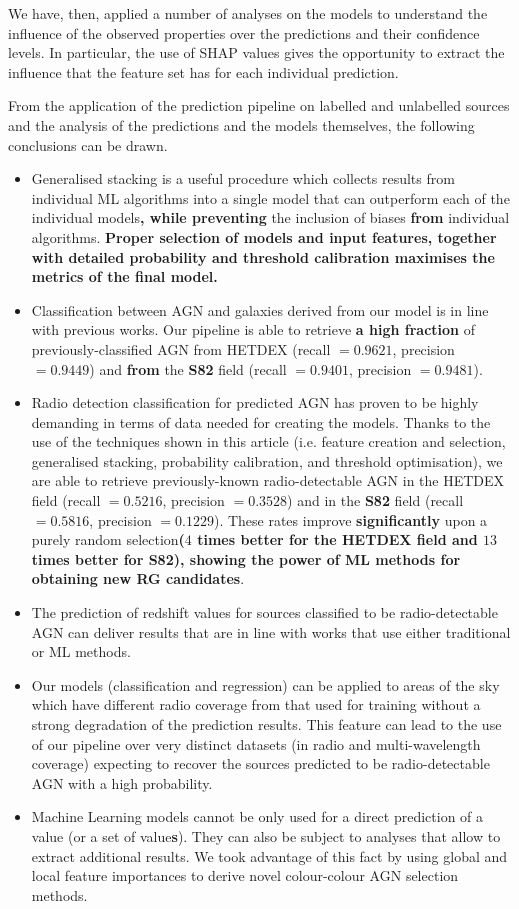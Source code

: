 \documentclass{aa}
\begin{document}
We have, then, applied a number of analyses on the models to understand the influence of the observed properties over the predictions and their confidence levels. In particular, the use of SHAP values gives the opportunity to extract the influence that the feature set has for each individual prediction.

From the application of the prediction pipeline on labelled and unlabelled sources and the analysis of the predictions and the models themselves, the following conclusions can be drawn.

\begin{itemize}
\item Generalised stacking is a useful procedure which collects results from individual ML algorithms into a single model that can outperform each of the individual models\textbf{, while preventing} the inclusion of biases \textbf{from} individual algorithms. \textbf{Proper selection of models and input features, together with detailed probability and threshold calibration maximises the metrics of the final model.}
\item Classification between AGN and galaxies derived from our model is in line with previous works. Our pipeline is able to retrieve \textbf{a high fraction} of previously-classified AGN from HETDEX (recall $= 0.9621$, precision $= 0.9449$) and \textbf{from} the \textbf{S82} field (recall $= 0.9401$, precision $= 0.9481$).
\item Radio detection classification for predicted AGN has proven to be highly demanding in terms of data needed for creating the models. Thanks to the use of the techniques shown in this article (i.e. feature creation and selection, generalised stacking, probability calibration, and threshold optimisation), we are able to retrieve previously-known radio-detectable AGN in the HETDEX field (recall $= 0.5216$, precision $= 0.3528$) and in the \textbf{S82} field (recall $= 0.5816$, precision $= 0.1229$). These rates improve \textbf{significantly} upon a purely random selection\textbf{($4$ times better for the HETDEX field and $13$ times better for S82), showing the power of ML methods for obtaining new RG candidates}.
\item The prediction of redshift values for sources classified to be radio-detectable AGN can deliver results that are in line with works that use either traditional or ML methods.
\item Our models (classification and regression) can be applied to areas of the sky which have different radio coverage from that used for training without a strong degradation of the prediction results. This feature can lead to the use of our pipeline over very distinct datasets (in radio and multi-wavelength coverage) expecting to recover the sources predicted to be radio-detectable AGN with a high probability.
\item Machine Learning models cannot be only used for a direct prediction of a value (or a set of value\textbf{s}). They can also be subject to analyses that allow to extract additional results. We took advantage of this fact by using global and local feature importances to derive novel colour-colour AGN selection methods.
\end{itemize}
\end{document}
